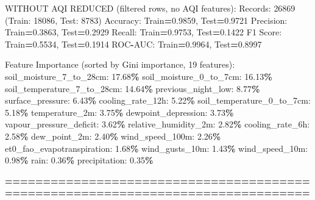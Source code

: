 \documentclass[
  letterpaper,
  DIV=11,
  numbers=noendperiod]{scrartcl}
\newenvironment{Shaded}{\begin{snugshade}}{\end{snugshade}}
\newcommand{\BuiltInTok}[1]{#1}
\newcommand{\DecValTok}[1]{\textcolor[rgb]{0.00,0.00,0.81}{#1}}
\newcommand{\FloatTok}[1]{\textcolor[rgb]{0.00,0.00,0.81}{#1}}
\newcommand{\NormalTok}[1]{#1}
\newcommand{\OperatorTok}[1]{\textcolor[rgb]{0.81,0.36,0.00}{\textbf{#1}}}
\begin{document}
\begin{Shaded}
\begin{Highlighting}[]
\NormalTok{WITHOUT AQI REDUCED (filtered rows, no AQI features):}
\NormalTok{  Records: }\DecValTok{26869}\NormalTok{ (Train: }\DecValTok{18086}\NormalTok{, Test: }\DecValTok{8783}\NormalTok{)}
\NormalTok{  Accuracy: Train}\OperatorTok{=}\FloatTok{0.9859}\NormalTok{, Test}\OperatorTok{=}\FloatTok{0.9721}
\NormalTok{  Precision: Train}\OperatorTok{=}\FloatTok{0.3863}\NormalTok{, Test}\OperatorTok{=}\FloatTok{0.2929}
\NormalTok{  Recall: Train}\OperatorTok{=}\FloatTok{0.9753}\NormalTok{, Test}\OperatorTok{=}\FloatTok{0.1422}
\NormalTok{  F1 Score: Train}\OperatorTok{=}\FloatTok{0.5534}\NormalTok{, Test}\OperatorTok{=}\FloatTok{0.1914}
\NormalTok{  ROC}\OperatorTok{{-}}\NormalTok{AUC: Train}\OperatorTok{=}\FloatTok{0.9964}\NormalTok{, Test}\OperatorTok{=}\FloatTok{0.8997}

\NormalTok{  Feature Importance (}\BuiltInTok{sorted}\NormalTok{ by Gini importance, }\DecValTok{19}\NormalTok{ features):}
\NormalTok{    soil\_moisture\_7\_to\_28cm: }\FloatTok{17.68}\OperatorTok{\%}
\NormalTok{    soil\_moisture\_0\_to\_7cm: }\FloatTok{16.13}\OperatorTok{\%}
\NormalTok{    soil\_temperature\_7\_to\_28cm: }\FloatTok{14.64}\OperatorTok{\%}
\NormalTok{    previous\_night\_low: }\FloatTok{8.77}\OperatorTok{\%}
\NormalTok{    surface\_pressure: }\FloatTok{6.43}\OperatorTok{\%}
\NormalTok{    cooling\_rate\_12h: }\FloatTok{5.22}\OperatorTok{\%}
\NormalTok{    soil\_temperature\_0\_to\_7cm: }\FloatTok{5.18}\OperatorTok{\%}
\NormalTok{    temperature\_2m: }\FloatTok{3.75}\OperatorTok{\%}
\NormalTok{    dewpoint\_depression: }\FloatTok{3.73}\OperatorTok{\%}
\NormalTok{    vapour\_pressure\_deficit: }\FloatTok{3.62}\OperatorTok{\%}
\NormalTok{    relative\_humidity\_2m: }\FloatTok{2.82}\OperatorTok{\%}
\NormalTok{    cooling\_rate\_6h: }\FloatTok{2.58}\OperatorTok{\%}
\NormalTok{    dew\_point\_2m: }\FloatTok{2.40}\OperatorTok{\%}
\NormalTok{    wind\_speed\_100m: }\FloatTok{2.26}\OperatorTok{\%}
\NormalTok{    et0\_fao\_evapotranspiration: }\FloatTok{1.68}\OperatorTok{\%}
\NormalTok{    wind\_gusts\_10m: }\FloatTok{1.43}\OperatorTok{\%}
\NormalTok{    wind\_speed\_10m: }\FloatTok{0.98}\OperatorTok{\%}
\NormalTok{    rain: }\FloatTok{0.36}\OperatorTok{\%}
\NormalTok{    precipitation: }\FloatTok{0.35}\OperatorTok{\%}

\OperatorTok{================================================================================}


\end{Highlighting}
\end{Shaded}
\end{document}
